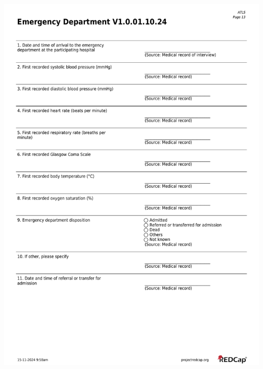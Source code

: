 \documentclass[
]{scrartcl}
\begin{document}
\includegraphics{../case-record-form/instrument-pdfs/pages/all-instruments-13.pdf}
\end{document}
